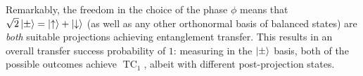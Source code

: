 \documentclass[
	aps, pra,
	superscriptaddress, twocolumn,
	floatfix,
	10pt
]{revtex4-1}
\newcommand{\on}[1]{\operatorname{#1}}
\newcommand{\calC}{{\mathcal{C}}}
\newcommand{\calH}{{\mathcal{H}}}
\newcommand{\calW}{{\mathcal{W}}}
\newcommand{\commale}[1]{{\textcolor{red} {\it{[Note (Ale): #1]}}}}
\begin{document}
Remarkably, the freedom in the choice of the phase $\phi$ means that $\sqrt2\ket\pm= \ket\uparrow+\ket\downarrow$ (as well as any other orthonormal basis of balanced states) are \emph{both} suitable projections achieving entanglement transfer.
This results in an overall transfer success probability of $1$: measuring in the $\ket\pm$ basis, both of the possible outcomes achieve $\on{TC}_1$, albeit with different post-projection states.
\end{document}
